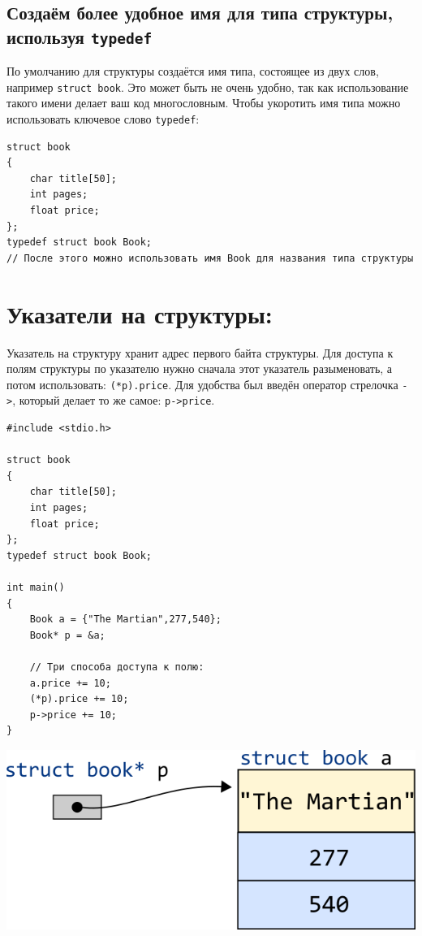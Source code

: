 \documentclass[10pt]{article}
\begin{document}
\subsection*{Создаём более удобное имя для типа структуры, используя \texttt{typedef}}
По умолчанию для структуры создаётся имя типа, состоящее из двух слов, например \texttt{struct book}. Это может быть не очень удобно, так как использование такого имени делает ваш код многословным. Чтобы укоротить имя типа можно использовать ключевое слово \texttt{typedef}:
\begin{lstlisting}
struct book 
{
    char title[50];
    int pages;
    float price;
};
typedef struct book Book;
// После этого можно использовать имя Book для названия типа структуры
\end{lstlisting}


\newpage
\section*{Указатели на структуры:}
Указатель на структуру хранит адрес первого байта структуры. Для доступа к полям структуры по указателю нужно сначала этот указатель разыменовать, а потом использовать: \texttt{(*p).price}. Для удобства был введён оператор стрелочка \texttt{->}, который делает то же самое: \texttt{p->price}.
\begin{multicols}{2}
\begin{lstlisting}
#include <stdio.h>

struct book 
{
    char title[50];
    int pages;
    float price;
};
typedef struct book Book;

int main() 
{
    Book a = {"The Martian",277,540};
    Book* p = &a;
    
    // Три способа доступа к полю:
    a.price += 10;
    (*p).price += 10;
    p->price += 10;
}
\end{lstlisting}
\vfill\null
\columnbreak
\vspace*{3\baselineskip}
\begin{center}
\includegraphics[scale=0.5]{../images/structpointer2.png}
\end{center}
\end{multicols}
\end{document}
